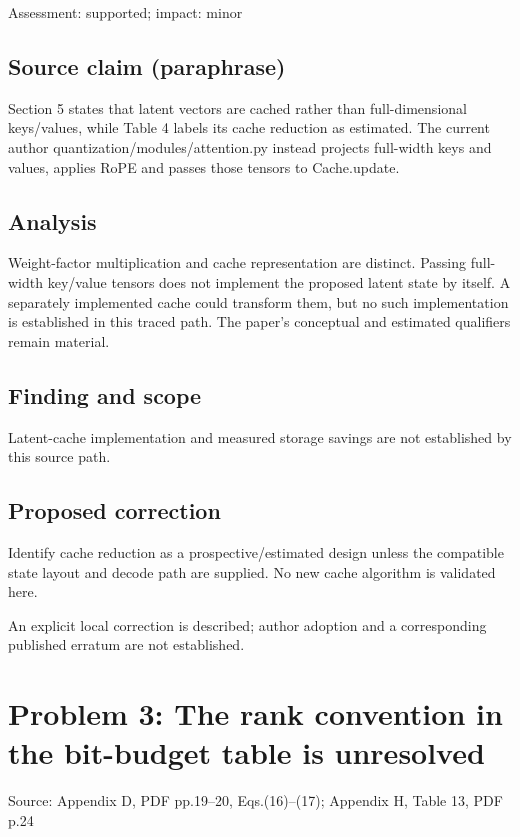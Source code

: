 \documentclass[11pt]{article}
\begin{document}
Assessment: supported; impact: minor

\subsection*{Source claim (paraphrase)}

Section 5 states that latent vectors are cached rather than full-dimensional keys/values, while Table 4 labels its cache reduction as estimated. The current author quantization/modules/attention.py instead projects full-width keys and values, applies RoPE and passes those tensors to Cache.update.

\subsection*{Analysis}

Weight-factor multiplication and cache representation are distinct. Passing full-width key/value tensors does not implement the proposed latent state by itself. A separately implemented cache could transform them, but no such implementation is established in this traced path. The paper’s conceptual and estimated qualifiers remain material.

\subsection*{Finding and scope}

Latent-cache implementation and measured storage savings are not established by this source path.

\subsection*{Proposed correction}

Identify cache reduction as a prospective/estimated design unless the compatible state layout and decode path are supplied. No new cache algorithm is validated here.

An explicit local correction is described; author adoption and a corresponding published erratum are not established.

\section*{Problem 3: The rank convention in the bit-budget table is unresolved}

Source: Appendix D, PDF pp.19–20, Eqs.(16)–(17); Appendix H, Table 13, PDF p.24
\end{document}
